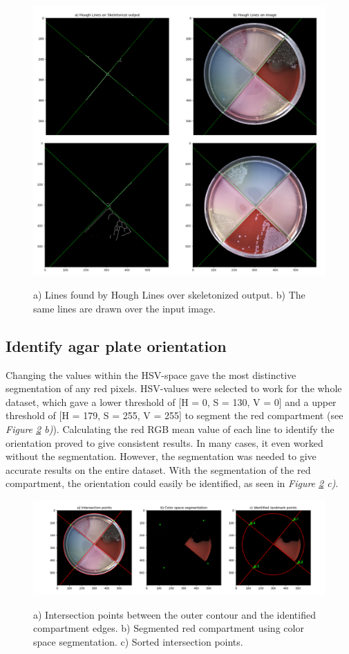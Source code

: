 \begin{figure}[H]
    \centering
      \includegraphics[width=.81\linewidth]{figures/PDF/Hough_lines_double.pdf}\\
    \caption{a) Lines found by Hough Lines over skeletonized output. b) The same lines are drawn over the input image.}
    \label{fig:result houghlines}
\end{figure}

\subsection{Identify agar plate orientation}
Changing the values within the HSV-space gave the most distinctive segmentation of any red pixels. HSV-values were selected to work for the whole dataset, which gave a lower threshold of [H = 0, S = 130, V = 0] and a upper threshold of [H = 179, S = 255, V = 255] to segment the red compartment (see \textit{Figure \ref{fig:result segmentation} b)}). Calculating the red RGB mean value of each line to identify the orientation proved to give consistent results. In many cases, it even worked without the segmentation. However, the segmentation was needed to give accurate results on the entire dataset. With the segmentation of the red compartment, the orientation could easily be identified, as seen in \textit{Figure \ref{fig:result segmentation} c)}. 

\begin{figure}[H]
    \centering
      \includegraphics[width=1\linewidth]{figures/PDF/Segmentation.pdf}\\
    \caption{a) Intersection points between the outer contour and the identified compartment edges. b) Segmented red compartment using color space segmentation. c) Sorted intersection points. }
    \label{fig:result segmentation}
\end{figure}

